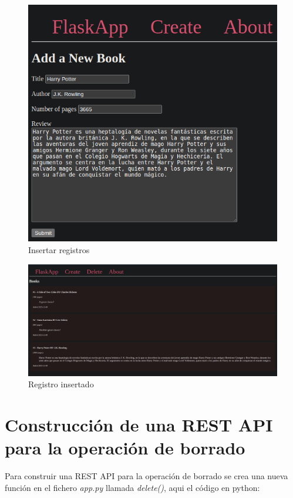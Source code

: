 \documentclass[11pt]{report}
\begin{document}
\begin{figure}[H]
  \centering
  \includegraphics[scale=0.45]{img/create_book.png}
  \caption{Insertar registros}
\end{figure}

\begin{figure}[H]
  \centering
  \includegraphics[scale=0.23]{img/added_book.png}
  \caption{Registro insertado}
\end{figure}

\cleardoublepage

\section{Construcción de una REST API para la operación de borrado}
Para construir una REST API para la operación de borrado se crea una nueva función en el fichero \emph{app.py}
llamada \emph{delete()}, aqui el código en python:
\lstset{style=mystyle}

\end{document}
